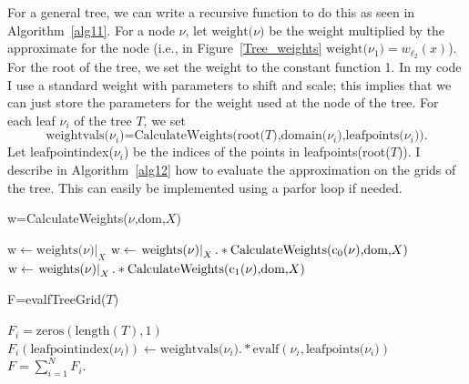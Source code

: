 \documentclass{article}
\newcommand{\child}[1]{c\textsubscript{#1}}
\begin{document}
For a general tree, we can write a recursive function to do this as seen in Algorithm~\ref{alg11}. For a node $\nu$, let $\text{weight($\nu$)}$ be the weight multiplied by the approximate for the node (i.e., in Figure~\ref{Tree_weights} $\text{weight($\nu_1$)}=w_{\ell_2}(x)$). For the root of the tree, we set the weight to the constant function 1. In my code I use a standard weight with parameters to shift and scale; this implies that we can just store the parameters for the weight used at the node of the tree. For each leaf $\nu_i$ of the tree $T$, we set
\begin{equation}
\text{weightvals($\nu_i$)=CalculateWeights(root($T$),domain($\nu_i$),leafpoints($\nu_i$))}.
\end{equation}
Let leafpointindex($\nu_i$) be the indices of the points in leafpoints(root($T$)). I describe in Algorithm~\ref{alg12} how to evaluate the approximation on the grids of the tree. This can easily be implemented using a parfor loop if needed.

\begin{algorithm}[!h]
\caption{w=CalculateWeights($\nu$,dom,$X$)}
\label{alg11}
\begin{algorithmic}
\STATE $\text{w} \leftarrow \left . \text{weights($\nu$)} \right |_{X}$
\ELSIF{$\text{dom}\subseteq \text{domain(\child{0}($\nu$))}$}
\STATE $\text{w} \leftarrow \left . \text{weights($\nu$)} \right |_{X}.*\text{CalculateWeights(\child{0}($\nu$),dom,$X$)}$
\ELSE
\STATE $\text{w} \leftarrow \left . \text{weights($\nu$)} \right |_{X}.*\text{CalculateWeights(\child{1}($\nu$),dom,$X$)}$
\ENDIF
\end{algorithmic}
\end{algorithm}



\begin{algorithm}[!h]
\caption{F=evalfTreeGrid($T$)}
\label{alg12}
\begin{algorithmic}
\STATE $F_i = \text{zeros}(\text{length}(T),1)$
\STATE $F_i(\text{leafpointindex($\nu_i$)}) \leftarrow \text{weightvals($\nu_i$)}.*\text{evalf}(\nu_i,\text{leafpoints($\nu_i$)})$
\ENDFOR
\STATE $F = \sum_{i=1}^N F_i$.
\end{algorithmic}
\end{algorithm}
\end{document}
